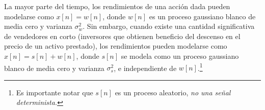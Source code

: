 \question[25]  %

\ifspanish

La mayor parte del tiempo, los rendimientos de una acción dada pueden modelarse como $x[n] = w[n]$, donde $w[n]$ es un proceso gaussiano blanco de media cero y varianza $\sigma_w^2$. Sin embargo, cuando existe una cantidad significativa de vendedores en corto (inversores que obtienen beneficio del descenso en el precio de un activo prestado), los rendimientos pueden modelarse como $x[n] = s[n] + w[n]$, donde $s[n]$ se modela como un proceso gaussiano blanco de media cero y varianza $\sigma_s^2$, e independiente de $w[n]$.\footnote{Es importante notar que $s[n]$ es un proceso aleatorio, \emph{no una señal determinista.}}

